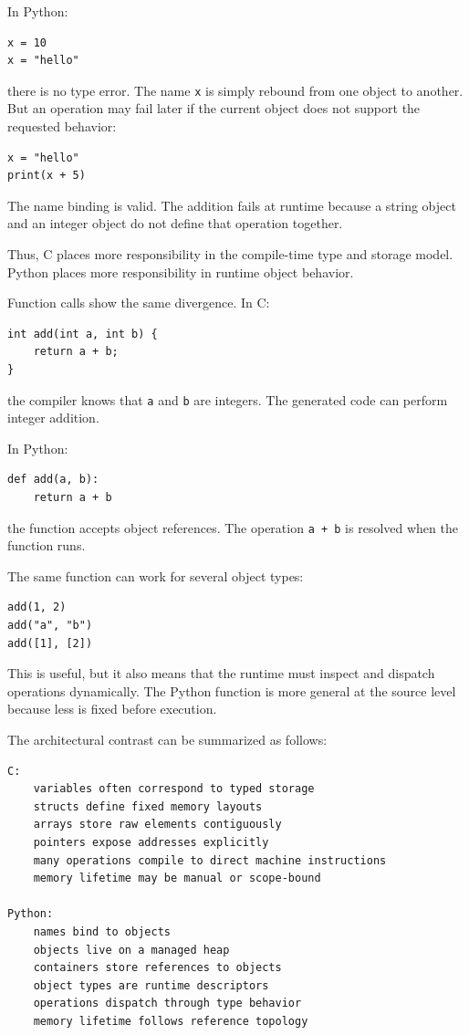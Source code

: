 In Python:

\begin{verbatim}
x = 10
x = "hello"
\end{verbatim}

there is no type error. The name \texttt{x} is simply rebound from one object to another. But an operation may fail later if the current object does not support the requested behavior:

\begin{verbatim}
x = "hello"
print(x + 5)
\end{verbatim}

The name binding is valid. The addition fails at runtime because a string object and an integer object do not define that operation together.

Thus, C places more responsibility in the compile-time type and storage model. Python places more responsibility in runtime object behavior.

Function calls show the same divergence. In C:

\begin{verbatim}
int add(int a, int b) {
    return a + b;
}
\end{verbatim}

the compiler knows that \texttt{a} and \texttt{b} are integers. The generated code can perform integer addition.

In Python:

\begin{verbatim}
def add(a, b):
    return a + b
\end{verbatim}

the function accepts object references. The operation \texttt{a + b} is resolved when the function runs.

The same function can work for several object types:

\begin{verbatim}
add(1, 2)
add("a", "b")
add([1], [2])
\end{verbatim}

This is useful, but it also means that the runtime must inspect and dispatch operations dynamically. The Python function is more general at the source level because less is fixed before execution.

The architectural contrast can be summarized as follows:

\begin{verbatim}
C:
    variables often correspond to typed storage
    structs define fixed memory layouts
    arrays store raw elements contiguously
    pointers expose addresses explicitly
    many operations compile to direct machine instructions
    memory lifetime may be manual or scope-bound

Python:
    names bind to objects
    objects live on a managed heap
    containers store references to objects
    object types are runtime descriptors
    operations dispatch through type behavior
    memory lifetime follows reference topology
\end{verbatim}

